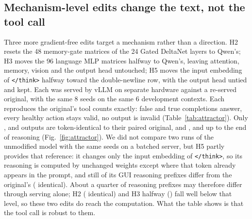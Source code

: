 \subsection{Mechanism-level edits change the text, not the tool call}
\label{sec:attractor}
Three more gradient-free edits target a mechanism rather than a direction. H2 resets the 48 memory-gate matrices of the 24 Gated DeltaNet layers \citep{yang2025gateddeltanet} to Qwen's; H3 moves the 96 language MLP matrices halfway to Qwen's, leaving attention, memory, vision and the output head untouched; H5 moves the input embedding of \texttt{</think>} halfway toward the double-newline row, with the output head untied and kept. %
Each was served by vLLM on separate hardware against a re-served original, with the same 8 seeds on the same 6 development contexts. Each reproduces the original's tool counts exactly: \attHtwoFsp{} false and \attHtwoFsm{} true completions answer, every healthy action stays valid, no output is invalid (Table~\ref{tab:attractor}). Only \attHtwoFull, \attHthreehalfFull{} and \attHfivehalfFull{} outputs are token-identical to their paired original, and \attHtwoReason, \attHthreehalfReason{} and \attHfivehalfReason{} up to the end of reasoning (Fig.~\ref{fig:attractor}). We did not compare two runs of the unmodified model with the same seeds on a batched server, but H5 partly provides that reference: it changes only the input embedding of \texttt{</think>}, so its reasoning is computed by unchanged weights except where that token already appears in the prompt, and still \attHfivehalfGuiDiffer{} of its GUI reasoning prefixes differ from the original's (\attHfivehalfGuiReason{} identical). About a quarter of reasoning prefixes may therefore differ through serving alone; H2 (\attHtwoGuiReason{} identical) and H3 halfway (\attHthreehalfGuiReason) fall well below that level, so these two edits do reach the computation. What the table shows is that the tool call is robust to them. %

